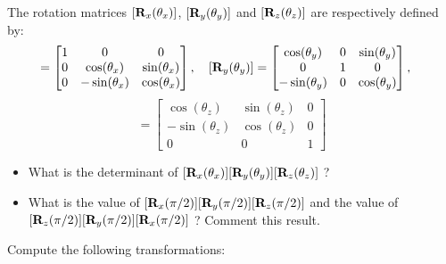 \bexo
The rotation matrices $[\textbf{R}_x(\theta_x)]$, $[\textbf{R}_y(\theta_y)]$ and $[\textbf{R}_z(\theta_z)]$
are respectively defined by:
\begin{equation}
	[\tb{R}_x(\theta_x)]=\begin{bmatrix}
		1&0&0\\
		0 & \cos(\theta_x) &\sin(\theta_x)\\
		0 & -\sin(\theta_x) &\cos(\theta_x) 
	\end{bmatrix}\esp 
	[\tb{R}_y(\theta_y)]=\begin{bmatrix}
	\cos(\theta_y) &0&\sin(\theta_y)\\
0&1&0\\
-\sin(\theta_y)&0&\cos(\theta_y) 
	\end{bmatrix}
	\esp 
\end{equation}
\begin{equation}
[\tb{R}_z(\theta_z)]=\begin{bmatrix}
		\cos(\theta_z) &\sin(\theta_z)&0\\
		-\sin(\theta_z) &\cos(\theta_z)& 0\\
		0&0&1 
	\end{bmatrix}
\end{equation}

\begin{itemize}
	\item What is the determinant of $[\textbf{R}_x(\theta_x)][\textbf{R}_y(\theta_y)][\textbf{R}_z(\theta_z)]$ ?
	\item What is the value of $[\textbf{R}_x(\pi/2)][\textbf{R}_y(\pi/2)][\textbf{R}_z(\pi/2)]$ and the value of $[\textbf{R}_z(\pi/2)][\textbf{R}_y(\pi/2)][\textbf{R}_x(\pi/2)]$ ? Comment this result.
\end{itemize}





Compute the following transformations:
 




\eexo 

\solution{}
	




